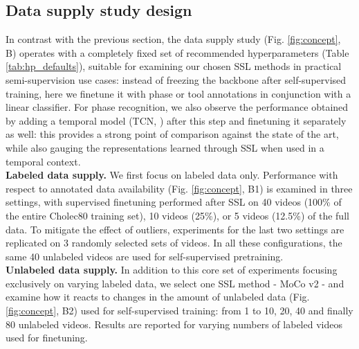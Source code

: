 \documentclass[times,twocolumn,final]{elsarticle}
\begin{document}
\subsection{Data supply study design}\label{sec:scalability_study}
In contrast with the previous section, the data supply study (Fig. \ref{fig:concept}, B) operates with a completely fixed set of recommended hyperparameters (Table \ref{tab:hp_defaults}), suitable for examining our chosen SSL methods in practical semi-supervision use cases: instead of freezing the backbone after self-supervised training, here we finetune it with phase or tool annotations in conjunction with a linear classifier. For phase recognition, we also observe the performance obtained by adding a temporal model (TCN, \cite{Czempiel2020TeCNOSP}) after this step and finetuning it separately as well: this provides a strong point of comparison against the state of the art, while also gauging the representations learned through SSL when used in a temporal context.
\\
\noindent\textbf{Labeled data supply. }
We first focus on labeled data only. Performance with respect to annotated data availability (Fig. \ref{fig:concept}, B1) is examined in three settings, with supervised finetuning performed after SSL on 40 videos (100\% of the entire Cholec80 training set), 10 videos (25\%), or 5 videos (12.5\%) of the full data. To mitigate the effect of outliers, experiments for the last two settings are replicated on 3 randomly selected sets of videos. In all these configurations, the same 40 unlabeled videos are used for self-supervised pretraining.
\\
\noindent\textbf{Unlabeled data supply. }
In addition to this core set of experiments focusing exclusively on varying labeled data, we select one SSL method - MoCo v2 - and examine how it reacts to changes in the amount of unlabeled data  (Fig. \ref{fig:concept}, B2) used for self-supervised training: from 1 to 10, 20, 40 and finally 80 unlabeled videos. Results are reported for varying numbers of labeled videos used for finetuning.
\end{document}
